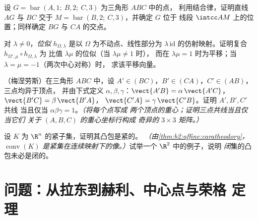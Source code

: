 \begin{exercise}[$\star$]\label{exo:b2:affine:9}
设 $G = \operatorname{bar}(A, 1;\ B, 2;\ C, 3)$ 为三角形 $ABC$ 中的点，
利用结合律，证明直线 $AG$ 与 $BC$
交于 $M = \operatorname{bar}(B, 2;\ C, 3)$，并确定 $G$ 位于
线段 $\intcc AM$ 上的位置；同样确定 $BG$
与 $CA$ 的交点。
\end{exercise}

\begin{exercise}[$\star\star$]\label{exo:b2:affine:10}
对 $\lambda \neq 0$，\emph{位似} $h_{\Omega,
\lambda}$ 是以 $\Omega$ 为不动点、线性部分为
$\lambda\,\mathrm{id}$ 的仿射映射。证明复合
$h_{\Omega', \mu} \circ h_{\Omega, \lambda}$ 为
比值 $\lambda\mu$ 的位似（当 $\lambda\mu \neq 1$ 时），
而在 $\lambda\mu = 1$ 时为平移；当 $\lambda = \mu = -1$（两次中心对称）时，
求该平移向量。
\end{exercise}

\begin{exercise}[$\star\star$]\label{exo:b2:affine:11}
（梅涅劳斯）在三角形 $ABC$ 中，设 $A' \in (BC)$，$B' \in
(CA)$，$C' \in (AB)$，三点均异于顶点，
并由下式定义 $\alpha, \beta, \gamma$：$\vect{A'B} =
\alpha\,\vect{A'C}$，$\vect{B'C} = \beta\,\vect{B'A}$，
$\vect{C'A} = \gamma\,\vect{C'B}$。证明 $A', B', C'$ 共线
当且仅当 $\alpha\beta\gamma = 1$。\emph{（将每个点写成
两个顶点的重心；证明三点共线当且仅当它们
关于 $(A, B, C)$ 的重心坐标行构成
奇异的 $3 \times 3$ 矩阵。）}
\end{exercise}

\begin{exercise}[$\star\star\star$]\label{exo:b2:affine:12}
设 $K$ 为 $\R^n$ 的紧子集，证明其凸包是紧的。
\emph{（由\cref{thm:b2:affine:caratheodory}，
$\operatorname{conv}(K)$ 是紧集在连续映射下的像。）}试举一个
$\R^2$ 中的例子，说明
\emph{闭}集的凸包未必是闭的。
\end{exercise}

\section{问题：从拉东到赫利、中心点与荣格
定理}

